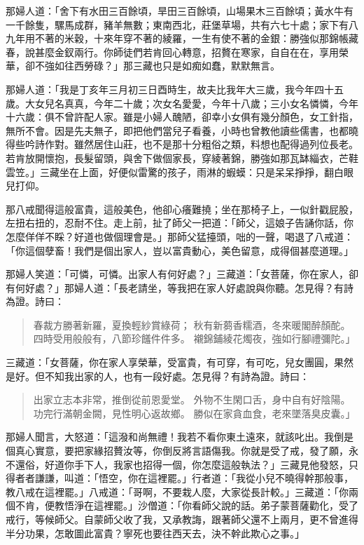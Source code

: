 那婦人道：「舍下有水田三百餘頃，旱田三百餘頃，山場果木三百餘頃；黃水牛有一千餘隻，騾馬成群，豬羊無數；東南西北，莊堡草場，共有六七十處；家下有八九年用不著的米穀，十來年穿不著的綾羅，一生有使不著的金銀：勝強似那錦帳藏春，說甚麼金釵兩行。你師徒們若肯回心轉意，招贅在寒家，自自在在，享用榮華，卻不強如往西勞碌？」那三藏也只是如痴如蠢，默默無言。

那婦人道：「我是丁亥年三月初三日酉時生，故夫比我年大三歲，我今年四十五歲。大女兒名真真，今年二十歲；次女名愛愛，今年十八歲；三小女名憐憐，今年十六歲：俱不曾許配人家。雖是小婦人醜陋，卻幸小女俱有幾分顏色，女工針指，無所不會。因是先夫無子，即把他們當兒子看養，小時也曾教他讀些儒書，也都曉得些吟詩作對。雖然居住山莊，也不是那十分粗俗之類，料想也配得過列位長老。若肯放開懷抱，長髮留頭，與舍下做個家長，穿綾著錦，勝強如那瓦缽緇衣，芒鞋雲笠。」三藏坐在上面，好便似雷驚的孩子，雨淋的蝦蟆：只是呆呆掙掙，翻白眼兒打仰。

那八戒聞得這般富貴，這般美色，他卻心癢難撓；坐在那椅子上，一似針戳屁股，左扭右扭的，忍耐不住。走上前，扯了師父一把道：「師父，這娘子告誦你話，你怎麼佯佯不睬？好道也做個理會是。」那師父猛擡頭，咄的一聲，喝退了八戒道：「你這個孽畜！我們是個出家人，豈以富貴動心，美色留意，成得個甚麼道理。」

那婦人笑道：「可憐，可憐。出家人有何好處？」三藏道：「女菩薩，你在家人，卻有何好處？」那婦人道：「長老請坐，等我把在家人好處說與你聽。怎見得？有詩為證。詩曰：
\begin{quote}
春裁方勝著新羅，夏換輕紗賞綠荷；
秋有新蒭香糯酒，冬來暖閣醉顏酡。
四時受用般般有，八節珍饈件件多。
襯錦鋪綾花燭夜，強如行腳禮彌陀。」
\end{quote}

三藏道：「女菩薩，你在家人享榮華，受富貴，有可穿，有可吃，兒女團圓，果然是好。但不知我出家的人，也有一段好處。怎見得？有詩為證。詩曰：
\begin{quote}
出家立志本非常，推倒從前恩愛堂。
外物不生閑口舌，身中自有好陰陽。
功完行滿朝金闕，見性明心返故鄉。
勝似在家貪血食，老來墜落臭皮囊。」
\end{quote}

那婦人聞言，大怒道：「這潑和尚無禮！我若不看你東土遠來，就該叱出。我倒是個真心實意，要把家緣招贅汝等，你倒反將言語傷我。你就是受了戒，發了願，永不還俗，好道你手下人，我家也招得一個，你怎麼這般執法？」三藏見他發怒，只得者者謙謙，叫道：「悟空，你在這裡罷。」行者道：「我從小兒不曉得幹那般事，教八戒在這裡罷。」八戒道：「哥啊，不要栽人麼，大家從長計較。」三藏道：「你兩個不肯，便教悟淨在這裡罷。」沙僧道：「你看師父說的話。弟子蒙菩薩勸化，受了戒行，等候師父。自蒙師父收了我，又承教誨，跟著師父還不上兩月，更不曾進得半分功果，怎敢圖此富貴？寧死也要往西天去，決不幹此欺心之事。」

